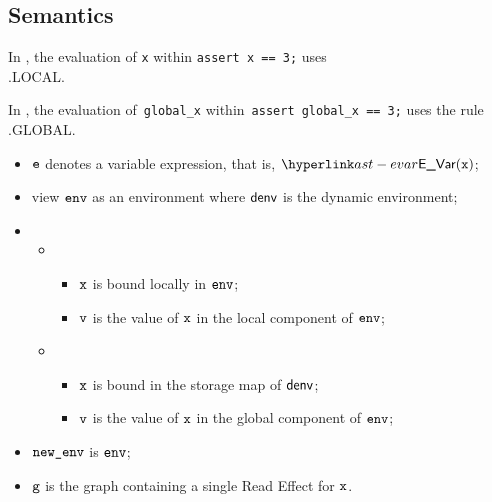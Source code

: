 \subsection{Semantics}

In , the evaluation of \texttt{x} within \texttt{assert x == 3;}
uses \\ .LOCAL.

In , the evaluation of~\texttt{global\_x} within~\texttt{assert global\_x == 3;}
uses the rule .GLOBAL.

\ProseParagraph
\AllApply
\begin{itemize}
  \item $\ve$ denotes a variable expression, that is, $\EVar(\vx)$;
  \item view $\env$ as an environment where $\denv$ is the dynamic environment;
  \item \OneApplies
  \begin{itemize}
    \item {}
    \begin{itemize}
      \item $\vx$ is bound locally in $\env$;
      \item $\vv$ is the value of $\vx$ in the local component of $\env$;
    \end{itemize}

    \item {}
    \begin{itemize}
      \item $\vx$ is bound in the storage map of $\denv$;
      \item $\vv$ is the value of $\vx$ in the global component of $\env$;
    \end{itemize}
  \end{itemize}
  \item $\newenv$ is $\env$;
  \item $\vg$ is the graph containing a single Read Effect for $\vx$.
\end{itemize}

\FormallyParagraph
\begin{mathpar}
\end{mathpar}

